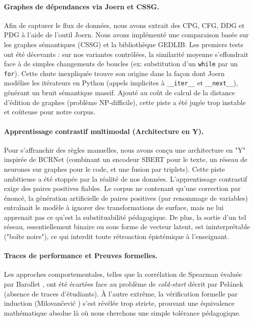 \paragraph{Graphes de dépendances via Joern et CSSG.}
Afin de capturer le flux de données, nous avons extrait des CPG, CFG, DDG et PDG à l'aide de l'outil Joern. Nous avons implémenté une comparaison basée sur les graphes sémantiques (CSSG) et la bibliothèque GEDLIB.
Les premiers tests ont été décevants : sur nos variantes contrôlées, la similarité moyenne s'effondrait face à de simples changements de boucles (ex: substitution d'un \texttt{while} par un \texttt{for}). Cette chute inexpliquée trouve son origine dans la façon dont Joern modélise les itérateurs en Python (appels implicites à \texttt{\_\_iter\_\_} et \texttt{\_\_next\_\_}), générant un bruit sémantique massif. Ajouté au coût de calcul de la distance d'édition de graphes (problème NP-difficile), cette piste a été jugée trop instable et coûteuse pour notre corpus.

\paragraph{Apprentissage contrastif multimodal (Architecture en Y).}
Pour s'affranchir des règles manuelles, nous avons conçu une architecture en "Y" inspirée de BCRNet (combinant un encodeur SBERT pour le texte, un réseau de neurones sur graphes pour le code, et une fusion par triplets). 
Cette piste ambitieuse a été stoppée par la réalité de nos données. L'apprentissage contrastif exige des paires positives fiables. Le corpus ne contenant qu'une correction par énoncé, la génération artificielle de paires positives (par renommage de variables) entraînait le modèle à ignorer des transformations de surface, mais ne lui apprenait pas ce qu'est la substituabilité pédagogique. De plus, la sortie d'un tel réseau, essentiellement binaire ou sous forme de vecteur latent, est ininterprétable ("boîte noire"), ce qui interdit toute rétroaction épistémique à l'enseignant.

\paragraph{Traces de performance et Preuves formelles.}
Les approches comportementales, telles que la corrélation de Spearman évaluée par Barollet \cite{barollet_2023}, ont été écartées face au problème de \emph{cold-start} décrit par Pelánek \cite{pelanek_2020} (absence de traces d'étudiants). À l'autre extrême, la vérification formelle par induction (Milovančević \cite{milovancevic_automated_nodate}) s'est révélée trop stricte, prouvant une équivalence mathématique absolue là où nous cherchons une simple tolérance pédagogique.

